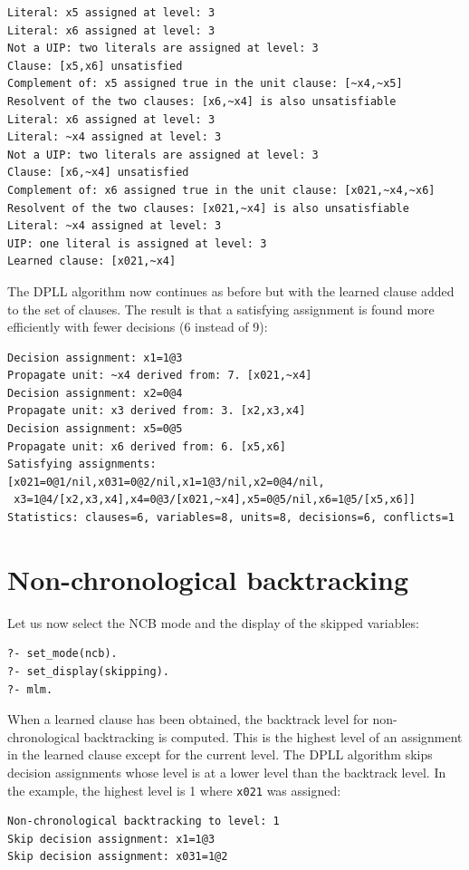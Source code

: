 \documentclass[11pt]{report}
\newcommand*{\p}[1]{\textup{\texttt{#1}}}
\begin{document}
\begin{verbatim}
Literal: x5 assigned at level: 3
Literal: x6 assigned at level: 3
Not a UIP: two literals are assigned at level: 3
Clause: [x5,x6] unsatisfied
Complement of: x5 assigned true in the unit clause: [~x4,~x5]
Resolvent of the two clauses: [x6,~x4] is also unsatisfiable
Literal: x6 assigned at level: 3
Literal: ~x4 assigned at level: 3
Not a UIP: two literals are assigned at level: 3
Clause: [x6,~x4] unsatisfied
Complement of: x6 assigned true in the unit clause: [x021,~x4,~x6]
Resolvent of the two clauses: [x021,~x4] is also unsatisfiable
Literal: ~x4 assigned at level: 3
UIP: one literal is assigned at level: 3
Learned clause: [x021,~x4]
\end{verbatim}

The DPLL algorithm now continues as before but with the learned clause
added to the set of clauses. The result is that a satisfying assignment
is found more efficiently with fewer decisions (6 instead of 9):

\begin{verbatim}
Decision assignment: x1=1@3
Propagate unit: ~x4 derived from: 7. [x021,~x4]
Decision assignment: x2=0@4
Propagate unit: x3 derived from: 3. [x2,x3,x4]
Decision assignment: x5=0@5
Propagate unit: x6 derived from: 6. [x5,x6]
Satisfying assignments:
[x021=0@1/nil,x031=0@2/nil,x1=1@3/nil,x2=0@4/nil,
 x3=1@4/[x2,x3,x4],x4=0@3/[x021,~x4],x5=0@5/nil,x6=1@5/[x5,x6]]
Statistics: clauses=6, variables=8, units=8, decisions=6, conflicts=1
\end{verbatim}


\section{Non-chronological backtracking}

Let us now select the NCB mode and the display of the skipped variables:
\begin{verbatim}
?- set_mode(ncb).
?- set_display(skipping).
?- mlm.
\end{verbatim}

When a learned clause has been obtained, the backtrack level for
non-chronological backtracking is computed. This is the highest level of
an assignment in the learned clause except for the current level.
The DPLL algorithm skips decision assignments whose level is at a lower
level than the backtrack level. In the example, the highest level is 1
where \p{x021} was assigned:

\begin{verbatim}
Non-chronological backtracking to level: 1
Skip decision assignment: x1=1@3
Skip decision assignment: x031=1@2
\end{verbatim}
\end{document}
